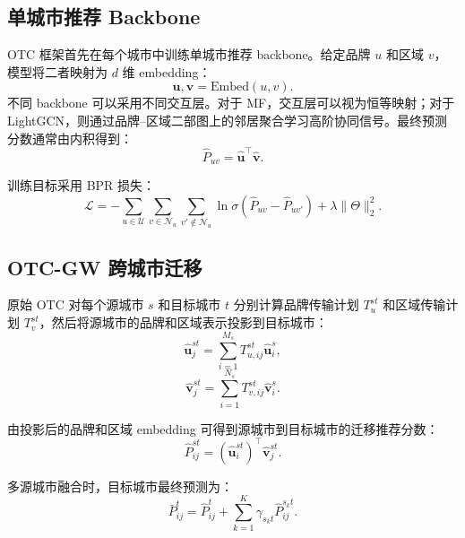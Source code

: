 \documentclass[10pt,twocolumn]{ctexart}
\begin{document}
\subsection{单城市推荐 Backbone}

OTC 框架首先在每个城市中训练单城市推荐 backbone。给定品牌 $u$ 和区域 $v$，模型将二者映射为 $d$ 维 embedding：
\begin{equation}
    \mathbf{u}, \mathbf{v} = \mathrm{Embed}(u,v).
\end{equation}
不同 backbone 可以采用不同交互层。对于 MF，交互层可以视为恒等映射；对于 LightGCN，则通过品牌--区域二部图上的邻居聚合学习高阶协同信号。最终预测分数通常由内积得到：
\begin{equation}
    \hat{P}_{uv} = \hat{\mathbf{u}}^\top \hat{\mathbf{v}}.
\end{equation}

训练目标采用 BPR 损失：
\begin{equation}
    \mathcal{L} =
    -\sum_{u\in \mathcal{U}}\sum_{v\in \mathcal{N}_u}\sum_{v'\notin \mathcal{N}_u}
    \ln \sigma(\hat{P}_{uv}-\hat{P}_{uv'})
    + \lambda \|\Theta\|_2^2.
\end{equation}

\subsection{OTC-GW 跨城市迁移}

原始 OTC 对每个源城市 $s$ 和目标城市 $t$ 分别计算品牌传输计划 $T_u^{st}$ 和区域传输计划 $T_v^{st}$，然后将源城市的品牌和区域表示投影到目标城市：
\begin{equation}
    \hat{\mathbf{u}}_{j}^{st} = \sum_{i=1}^{M_s} T^{st}_{u,ij}\hat{\mathbf{u}}_{i}^{s},
\end{equation}
\begin{equation}
    \hat{\mathbf{v}}_{j}^{st} = \sum_{i=1}^{N_s} T^{st}_{v,ij}\hat{\mathbf{v}}_{i}^{s}.
\end{equation}

由投影后的品牌和区域 embedding 可得到源城市到目标城市的迁移推荐分数：
\begin{equation}
    \hat{P}^{st}_{ij} = (\hat{\mathbf{u}}^{st}_{i})^\top \hat{\mathbf{v}}^{st}_{j}.
\end{equation}

多源城市融合时，目标城市最终预测为：
\begin{equation}
    \bar{P}^{t}_{ij}
    =
    \hat{P}^{t}_{ij}
    +
    \sum_{k=1}^{K}\gamma_{s_k t}\hat{P}^{s_k t}_{ij}.
\end{equation}
\end{document}
